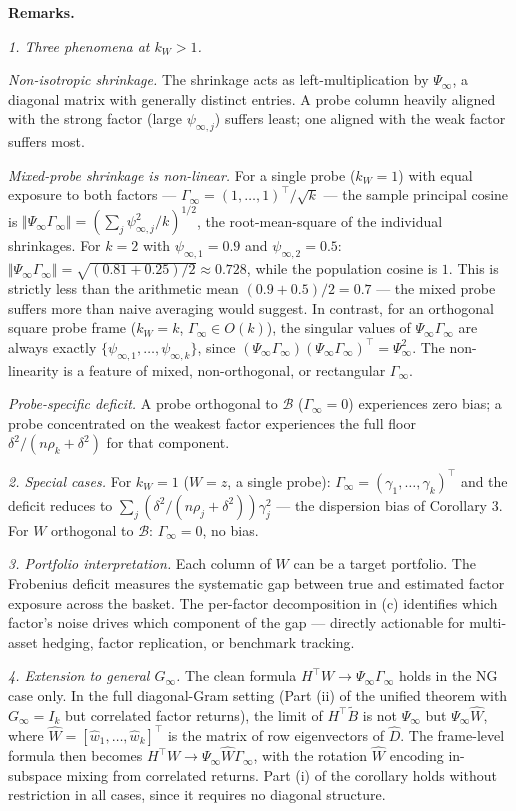 \documentclass{article}
\theoremstyle{remark}
\begin{document}
\textbf{Remarks.}

\textit{1. Three phenomena at $k_W > 1$.}

\textit{Non-isotropic shrinkage.} The shrinkage acts as left-multiplication by $\Psi_\infty$, a diagonal matrix with generally distinct entries. A probe column heavily aligned with the strong factor (large $\psi_{\infty,j}$) suffers least; one aligned with the weak factor suffers most.

\textit{Mixed-probe shrinkage is non-linear.} For a single probe ($k_W = 1$) with equal exposure to both factors — $\Gamma_\infty = (1,\ldots,1)^\top/\sqrt{k}$ — the sample principal cosine is $\Vert \Psi_\infty\Gamma_\infty\Vert  = (\sum_j\psi_{\infty,j}^2/k)^{1/2}$, the root-mean-square of the individual shrinkages. For $k=2$ with $\psi_{\infty,1} = 0.9$ and $\psi_{\infty,2} = 0.5$: $\Vert \Psi_\infty\Gamma_\infty\Vert  = \sqrt{(0.81+0.25)/2} \approx 0.728$, while the population cosine is $1$. This is strictly less than the arithmetic mean $(0.9+0.5)/2 = 0.7$ — the mixed probe suffers more than naive averaging would suggest. In contrast, for an orthogonal square probe frame ($k_W = k$, $\Gamma_\infty \in O(k)$), the singular values of $\Psi_\infty\Gamma_\infty$ are always exactly $\{\psi_{\infty,1},\ldots,\psi_{\infty,k}\}$, since $(\Psi_\infty\Gamma_\infty)(\Psi_\infty\Gamma_\infty)^\top = \Psi_\infty^2$. The non-linearity is a feature of mixed, non-orthogonal, or rectangular $\Gamma_\infty$.

\textit{Probe-specific deficit.} A probe orthogonal to $\mathcal{B}$ ($\Gamma_\infty = 0$) experiences zero bias; a probe concentrated on the weakest factor experiences the full floor $\delta^2/(n\rho_k+\delta^2)$ for that component.

\textit{2. Special cases.} For $k_W = 1$ ($W = z$, a single probe): $\Gamma_\infty = (\gamma_1,\ldots,\gamma_k)^\top$ and the deficit reduces to $\sum_j(\delta^2/(n\rho_j+\delta^2))\gamma_j^2$ — the dispersion bias of Corollary 3. For $W$ orthogonal to $\mathcal{B}$: $\Gamma_\infty = 0$, no bias.

\textit{3. Portfolio interpretation.} Each column of $W$ can be a target portfolio. The Frobenius deficit measures the systematic gap between true and estimated factor exposure across the basket. The per-factor decomposition in (c) identifies which factor's noise drives which component of the gap — directly actionable for multi-asset hedging, factor replication, or benchmark tracking.

\textit{4. Extension to general $G_\infty$.} The clean formula $H^\top W \to \Psi_\infty\Gamma_\infty$ holds in the NG case only. In the full diagonal-Gram setting (Part (ii) of the unified theorem with $G_\infty = I_k$ but correlated factor returns), the limit of $H^\top\tilde{B}$ is not $\Psi_\infty$ but $\Psi_\infty\hat{W}$, where $\hat{W} = [\hat{w}_1,\ldots,\hat{w}_k]^\top$ is the matrix of row eigenvectors of $\hat{D}$. The frame-level formula then becomes $H^\top W \to \Psi_\infty\hat{W}\Gamma_\infty$, with the rotation $\hat{W}$ encoding in-subspace mixing from correlated returns. Part (i) of the corollary holds without restriction in all cases, since it requires no diagonal structure.
\end{document}
